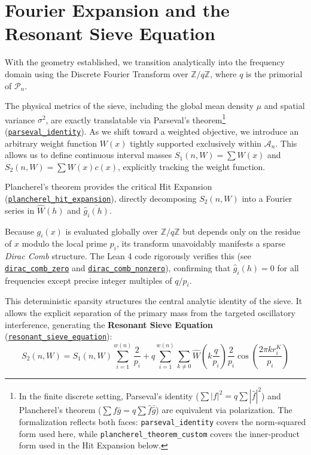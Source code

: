\documentclass[lean]{AFM}
\renewcommand{\.}{\hskip .75pt}
\def\urlpfx{https://github.com/ElNando888/KrafftSieve/blob/v1.2}
\begin{document}
\section{Fourier Expansion and the Resonant Sieve Equation} \label{resonance}

With the geometry established, we transition analytically into the frequency domain using the
Discrete Fourier Transform over $\mathbb{Z}/q\mathbb{Z}$, where $q$ is the primorial of
$\mathcal{P}_n$. 

The physical metrics of the sieve, including the global mean density $\mu$ and spatial variance
$\sigma^2$, are exactly translatable via Parseval's theorem\footnote{In the finite discrete
setting, Parseval's identity ($\sum |f|^2 = q\sum |\hat{f}|^2$) and Plancherel's theorem
($\sum f\bar{g} = q\sum \hat{f}\bar{\hat{g}}$) are equivalent via polarization. The
formalization reflects both faces: \texttt{parseval\_identity} covers the norm-squared form
used here, while \texttt{plancherel\_theorem\_custom} covers the inner-product form used in
the Hit Expansion below.}
(\href{\urlpfx/KrafftSieve/Variance.lean#L406}{\texttt{parseval\_identity}}). As we shift toward
a weighted objective, we introduce an arbitrary weight function $W(x)$ tightly supported
exclusively within $\mathcal{A}_n$. This allows us to define continuous interval masses
$S_1(n, W) = \sum W(x)$ and $S_2(n, W) = \sum W(x)c(x)$, explicitly tracking the weight function.

Plancherel's theorem provides the critical Hit Expansion
(\href{\urlpfx/KrafftSieve/ThirdHarmonic.lean#L187}{\texttt{plancherel\_hit\_expansion}}),
directly decomposing $S_2(n, W)$ into a Fourier series in $\hat{W}(h)$ and
$\overline{\hat{g}_i(h)}$.

Because $g_i(x)$ is evaluated globally over $\mathbb{Z}/q\mathbb{Z}$ but depends only on the
residue of $x$ modulo the local prime $p_i$, its transform unavoidably manifests a sparse
\textit{Dirac Comb} structure. The Lean 4 code rigorously verifies this
(see \href{\urlpfx/KrafftSieve/ThirdHarmonic.lean#L571}{\texttt{dirac\_comb\_zero}} and
\href{\urlpfx/KrafftSieve/ThirdHarmonic.lean#L349}{\texttt{dirac\_comb\_nonzero}}), confirming that
$\hat{g}_i(h) = 0$ for all frequencies except precise integer multiples of $q/p_i$.

This deterministic sparsity structures the central analytic identity of the sieve. It allows the
explicit separation of the primary mass from the targeted oscillatory interference, generating the
\textbf{Resonant Sieve Equation} (\href{\urlpfx/KrafftSieve/ThirdHarmonic.lean#L688}
{\texttt{resonant\_sieve\_equation}}):
$$ S_2(n, W) = S_1(n, W) \sum_{i=1}^{w(n)} \frac{2}{p_i} + q \sum_{i=1}^{w(n)} \sum_{k \neq 0}
\hat{W}\!\left(k \frac{q}{p_i}\right) \frac{2}{p_i} \cos\!\left( \frac{2 \pi k r^K_i}{p_i} \right) $$
\end{document}
